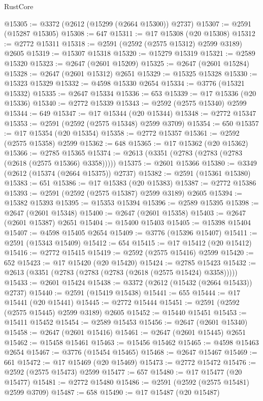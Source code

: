 \begin{lexlean}{RustCore}
\begin{coremodule}
@15305 := @3372 (@2612 (@15299 (@2664 @15300)) @2737)
@15307 := @2591 (@15287 @15305)
@15308 := 647
@15311 := @17 @15308 (@20 @15308)
@15312 := @2772 @15311
@15318 := @2591 (@2592 (@2575 @15312) @2599 @3189) @2605
@15319 := @15307 @15318
@15320 := @15279 @15319
@15321 := @2589 @15320
@15323 := @2647 (@2601 @15209)
@15325 := @2647 (@2601 @15284)
@15328 := @2647 (@2601 @15312) @2651
@15329 := @15325 @15328
@15330 := @15323 @15329
@15332 := @4598 @15330 @2654
@15334 := @3776 (@15321 @15332)
@15335 := @2647 @15334
@15336 := 653
@15339 := @17 @15336 (@20 @15336)
@15340 := @2772 @15339
@15343 := @2592 (@2575 @15340) @2599
@15344 := 649
@15347 := @17 @15344 (@20 @15344)
@15348 := @2772 @15347
@15353 := @2591 (@2592 (@2575 @15348) @2599 @3709)
@15354 := 650
@15357 := @17 @15354 (@20 @15354)
@15358 := @2772 @15357
@15361 := @2592 (@2575 @15358) @2599
@15362 := 648
@15365 := @17 @15362 (@20 @15362)
@15366 := @2785 @15365
@15374 := @2613 (@3351 (@2783 (@2783 (@2783 (@2618 (@2575 @15366) @3358)))))
@15375 := @2601 @15366
@15380 := @3349 (@2612 (@15374 (@2664 @15375)) @2737)
@15382 := @2591 (@15361 @15380)
@15383 := 651
@15386 := @17 @15383 (@20 @15383)
@15387 := @2772 @15386
@15393 := @2591 (@2592 (@2575 @15387) @2599 @3189) @2605
@15394 := @15382 @15393
@15395 := @15353 @15394
@15396 := @2589 @15395
@15398 := @2647 (@2601 @15348)
@15400 := @2647 (@2601 @15358)
@15403 := @2647 (@2601 @15387) @2651
@15404 := @15400 @15403
@15405 := @15398 @15404
@15407 := @4598 @15405 @2654
@15409 := @3776 (@15396 @15407)
@15411 := @2591 (@15343 @15409)
@15412 := 654
@15415 := @17 @15412 (@20 @15412)
@15416 := @2772 @15415
@15419 := @2592 (@2575 @15416) @2599
@15420 := 652
@15423 := @17 @15420 (@20 @15420)
@15424 := @2785 @15423
@15432 := @2613 (@3351 (@2783 (@2783 (@2783 (@2618 (@2575 @15424) @3358)))))
@15433 := @2601 @15424
@15438 := @3372 (@2612 (@15432 (@2664 @15433)) @2737)
@15440 := @2591 (@15419 @15438)
@15441 := 655
@15444 := @17 @15441 (@20 @15441)
@15445 := @2772 @15444
@15451 := @2591 (@2592 (@2575 @15445) @2599 @3189) @2605
@15452 := @15440 @15451
@15453 := @15411 @15452
@15454 := @2589 @15453
@15456 := @2647 (@2601 @15340)
@15458 := @2647 (@2601 @15416)
@15461 := @2647 (@2601 @15445) @2651
@15462 := @15458 @15461
@15463 := @15456 @15462
@15465 := @4598 @15463 @2654
@15467 := @3776 (@15454 @15465)
@15468 := @2647 @15467
@15469 := 661
@15472 := @17 @15469 (@20 @15469)
@15473 := @2772 @15472
@15476 := @2592 (@2575 @15473) @2599
@15477 := 657
@15480 := @17 @15477 (@20 @15477)
@15481 := @2772 @15480
@15486 := @2591 (@2592 (@2575 @15481) @2599 @3709)
@15487 := 658
@15490 := @17 @15487 (@20 @15487)

\end{coremodule}
\end{lexlean}

